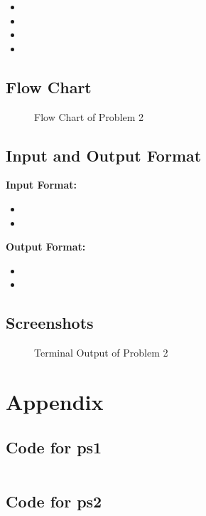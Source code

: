 \documentclass[12pt]{article}
\begin{document}
			\begin{itemize}
			\item 
			\item 
			\item 
			\item 
			\end{itemize}
		
		\subsection{Flow Chart}
		
			\begin{figure}[h!]
				\centering
				\caption{Flow Chart of Problem 2}
			\end{figure}
		
		
		\subsection{Input and Output Format}
			\textbf{Input Format:}
			\begin{itemize}
				\item 
				\item 
			 
			\end{itemize}
			\textbf{Output Format:}
			\begin{itemize}
				\item 
				\item 
				
			\end{itemize}
		\subsection{Screenshots}
		
			\begin{figure}[h!]
				\centering
				\caption{Terminal Output of Problem 2}
			\end{figure}
		
	\section{Appendix}
	
	
		\subsection{Code for ps1}
		
			\begin{verbatim}
			\end{verbatim}
		
		\subsection{Code for ps2}
		
			\begin{verbatim}
			
			\end{verbatim}
		
		
		
\end{document}
